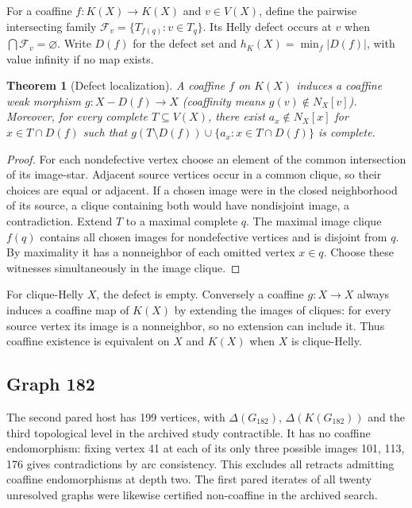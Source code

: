 \documentclass[11pt,a4paper]{article}
\newtheorem{theorem}{Theorem}[section]
\theoremstyle{definition}\newtheorem{definition}[theorem]{Definition}\newtheorem{example}[theorem]{Example}
\theoremstyle{remark}\newtheorem{remark}[theorem]{Remark}
\begin{document}
For a coaffine \(f:K(X)\to K(X)\) and \(v\in V(X)\), define the pairwise intersecting family \(\mathcal F_v=\{T_{f(q)}:v\in T_q\}\). Its Helly defect occurs at \(v\) when \(\bigcap\mathcal F_v=\varnothing\). Write \(D(f)\) for the defect set and \(h_K(X)=\min_f |D(f)|\), with value infinity if no map exists.
\begin{theorem}[Defect localization]\label{thm:defect}
A coaffine \(f\) on \(K(X)\) induces a coaffine weak morphism \(g:X-D(f)\to X\) (coaffinity means \(g(v)\notin N_X[v]\)). Moreover, for every complete \(T\subseteq V(X)\), there exist \(a_x\notin N_X[x]\) for \(x\in T\cap D(f)\) such that \(g(T\setminus D(f))\cup\{a_x:x\in T\cap D(f)\}\) is complete.
\end{theorem}
\begin{proof}
For each nondefective vertex choose an element of the common intersection of its image-star. Adjacent source vertices occur in a common clique, so their choices are equal or adjacent. If a chosen image were in the closed neighborhood of its source, a clique containing both would have nondisjoint image, a contradiction. Extend \(T\) to a maximal complete \(q\). The maximal image clique \(f(q)\) contains all chosen images for nondefective vertices and is disjoint from \(q\). By maximality it has a nonneighbor of each omitted vertex \(x\in q\). Choose these witnesses simultaneously in the image clique.
\end{proof}
For clique-Helly \(X\), the defect is empty. Conversely a coaffine \(g:X\to X\) always induces a coaffine map of \(K(X)\) by extending the images of cliques: for every source vertex its image is a nonneighbor, so no extension can include it. Thus coaffine existence is equivalent on \(X\) and \(K(X)\) when \(X\) is clique-Helly.

\subsection{Graph 182}
The second pared host has 199 vertices, with \(\Delta(G_{182})\), \(\Delta(K(G_{182}))\) and the third topological level in the archived study contractible. It has no coaffine endomorphism: fixing vertex 41 at each of its only three possible images 101, 113, 176 gives contradictions by arc consistency. This excludes all retracts admitting coaffine endomorphisms at depth two. The first pared iterates of all twenty unresolved graphs were likewise certified non-coaffine in the archived search.
\end{document}
